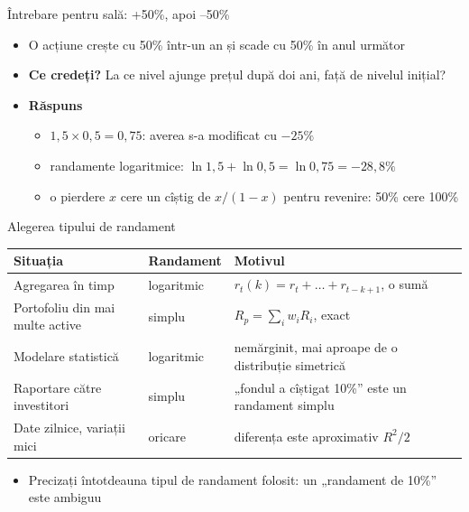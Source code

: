 \begin{frame}{Întrebare pentru sală: +50\%, apoi --50\%}
\itemsize{\small}
\begin{itemize}
    \item O acțiune crește cu 50\% într-un an și scade cu 50\% în anul următor
    \item \textbf{Ce credeți?} La ce nivel ajunge prețul după doi ani, față de nivelul inițial?
    \item \textbf{Răspuns}
    \begin{itemize}
        \item $1{,}5 \times 0{,}5 = 0{,}75$: averea s-a modificat cu $-25\%$
        \item randamente logaritmice: $\ln 1{,}5 + \ln 0{,}5 = \ln 0{,}75 = -28{,}8\%$
        \item o pierdere $x$ cere un cîștig de $x/(1-x)$ pentru revenire: 50\% cere 100\%
    \end{itemize}
\end{itemize}
\end{frame}

\begin{frame}{Alegerea tipului de randament}
\itemsize{\small}
\begin{center}
\footnotesize
\begin{tabular}{>{\raggedright\arraybackslash}p{4.2cm}>{\raggedright\arraybackslash}p{2.6cm}>{\raggedright\arraybackslash}p{5.6cm}}
\toprule
\textbf{Situația} & \textbf{Randament} & \textbf{Motivul} \\
\midrule
Agregarea în timp & logaritmic & $r_{t}(k) = r_t + \dots + r_{t-k+1}$, o sumă \\
Portofoliu din mai multe active & simplu & $R_p = \sum_i w_i R_i$, exact \\
Modelare statistică & logaritmic & nemărginit, mai aproape de o distribuție simetrică \\
Raportare către investitori & simplu & „fondul a cîștigat 10\%” este un randament simplu \\
Date zilnice, variații mici & oricare & diferența este aproximativ $R^2/2$ \\
\bottomrule
\end{tabular}
\end{center}
\begin{itemize}
    \item Precizați întotdeauna tipul de randament folosit: un „randament de 10\%” este ambiguu
\end{itemize}
\end{frame}


